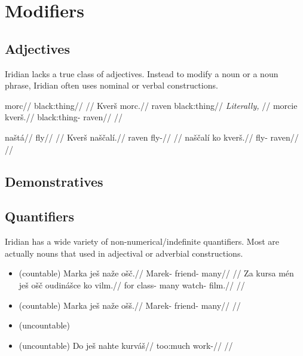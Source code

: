 \chapter{Modifiers}

\section{Adjectives}
Iridian lacks a true class of adjectives. Instead to modify a noun or a noun phrase, Iridian often uses nominal or verbal constructions.

\pex
\a
\begingl
\gla morc//
\glb black:thing//
\glft {}//
\endgl
\a
\begingl
\gla Kver\v{s} morc.//
\glb raven black:thing//
\glft {} \emph{Literally,} //
\endgl
\a
\begingl
\gla morcie kver\v{s}.//
\glb black:thing- raven//
\glft {}//
\endgl
\xe

\pex
\a
\begingl
\gla na\v{s}t\'a//
\glb fly//
\glft {}//
\endgl
\a
\begingl
\gla Kver\v{s} na\v{s}\v{c}al\'i.//
\glb raven fly-//
\glft {}//
\endgl
\a
\begingl
\gla na\v{s}\v{c}al\'i ko kver\v{s}.//
\glb fly-  raven//
\glft {}//
\endgl
\xe

\section{Demonstratives}\label{dem-adj}

\section{Quantifiers}
Iridian has a wide variety of non-numerical/indefinite quantifiers.  Most are actually nouns that used in adjectival or adverbial constructions.


\begin{itemize}
    \item {}  (countable)
    \ex
    \begingl
    \gla Marka je\v{s} na\v{z}e o\v{s}\v{c}.//
    \glb Marek-  friend- many//
    \glft {}//
    \endgl
    \xe
    \ex
    \begingl
    \gla Za kursa m\'en je\v{s} o\v{s}\v{c} oudin\'a\v{s}ce ko vilm.//
    \glb for class-   many watch-  film.//
    \glft {}//
    \endgl
    \xe
    \item {}  (countable)
    \ex
    \begingl
    \gla Marka je\v{s} na\v{z}e o\v{s}\v{s}.//
    \glb Marek-  friend- many//
    \glft {}//
    \endgl
    \xe
    \item {}  (uncountable)
    \item {}  (uncountable)
    \ex
    \begingl
    \gla Do je\v{s} nahte kurv\'a\v{s}//
    \glb {}  too:much work-//
    \glft {}//
    \endgl
    \xe

\end{itemize}

